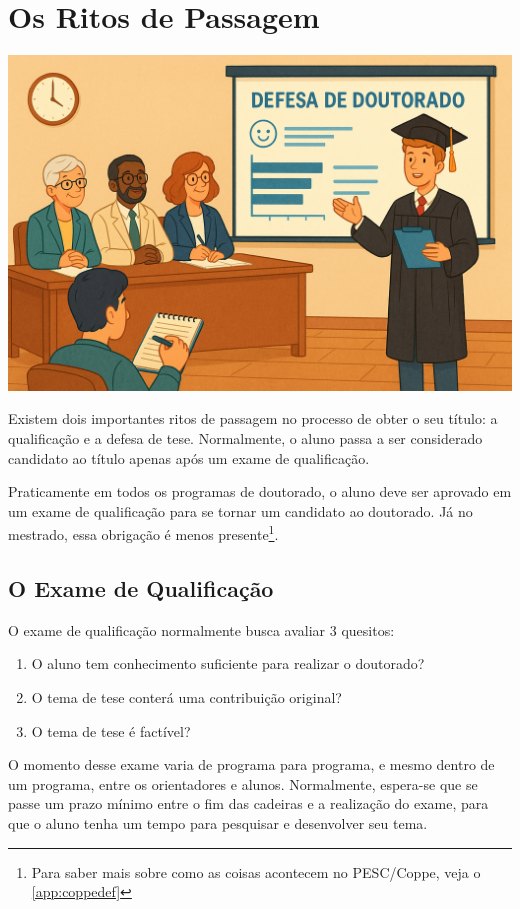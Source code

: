 \chapter{Os Ritos de Passagem}


\begin{center}
\includegraphics[width=0.5\linewidth]{Images/ritos.png}    
\end{center}
\vspace{0.5cm}

Existem dois importantes ritos de passagem no processo de obter o seu título: a qualificação e a defesa de tese. Normalmente, o aluno passa a ser considerado candidato ao título apenas após um exame de qualificação. 

Praticamente em todos os programas de doutorado, o aluno deve ser aprovado em um exame de qualificação para se tornar um candidato ao doutorado. Já no mestrado, essa obrigação é menos presente\footnote{Para saber mais sobre como as coisas acontecem no PESC/Coppe, veja o \autoref{app:coppedef}}.

\section{O Exame de Qualificação}

O exame de qualificação normalmente busca avaliar 3 quesitos:

\begin{enumerate}
\item	O aluno tem conhecimento suficiente para realizar o doutorado?
\item	O tema de tese conterá uma contribuição original?
\item	O tema de tese é factível?
\end{enumerate}

O momento desse exame varia de programa para programa, e mesmo dentro de um programa, entre os orientadores e alunos. Normalmente, espera-se que se passe um prazo mínimo entre o fim das cadeiras e a realização do exame, para que o aluno tenha um tempo para pesquisar e desenvolver seu tema. 

